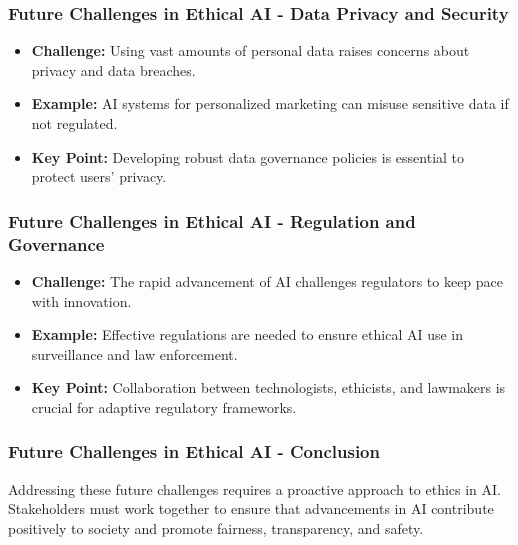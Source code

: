 \documentclass{beamer}
\begin{document}
\begin{frame}[fragile]
    \frametitle{Future Challenges in Ethical AI - Data Privacy and Security}
    \begin{itemize}
        \item \textbf{Challenge:} Using vast amounts of personal data raises concerns about privacy and data breaches.
        \item \textbf{Example:} AI systems for personalized marketing can misuse sensitive data if not regulated.
        \item \textbf{Key Point:} Developing robust data governance policies is essential to protect users' privacy.
    \end{itemize}
\end{frame}

\begin{frame}[fragile]
    \frametitle{Future Challenges in Ethical AI - Regulation and Governance}
    \begin{itemize}
        \item \textbf{Challenge:} The rapid advancement of AI challenges regulators to keep pace with innovation.
        \item \textbf{Example:} Effective regulations are needed to ensure ethical AI use in surveillance and law enforcement.
        \item \textbf{Key Point:} Collaboration between technologists, ethicists, and lawmakers is crucial for adaptive regulatory frameworks.
    \end{itemize}
\end{frame}

\begin{frame}[fragile]
    \frametitle{Future Challenges in Ethical AI - Conclusion}
    Addressing these future challenges requires a proactive approach to ethics in AI. Stakeholders must work together to ensure that advancements in AI contribute positively to society and promote fairness, transparency, and safety.
\end{frame}
\end{document}
